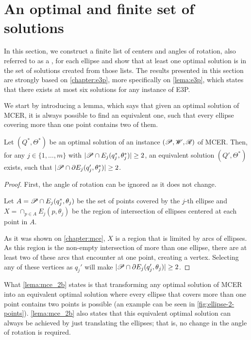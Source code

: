\section{An optimal and finite set of solutions}

In this section, we construct a finite list of centers and angles of rotation, also referred to as a , for each ellipse and show that at least one optimal solution is in the set of solutions created from those lists. The results presented in this section are strongly based on \autoref{chapter:e3p}, more specifically on \autoref{lema:e3p}, which states that there exists at most six solutions for any instance of E3P.

We start by introducing a lemma, which says that given an optimal solution of MCER, it is always possible to find an equivalent one, such that every ellipse covering more than one point contains two of them.

\begin{lema}\label{lema:mce_2b}
	Let $(Q^*, \Theta^*)$ be an optimal solution of an instance $(\mathscr{P}, \mathscr{W}, \mathscr{R})$ of MCER. 
	Then, for any $j\in\{1, \dots, m\}$ with $|\mathscr{P} \cap E_j(q_j^*, \theta_j^*)|\ge2$, 
	an equivalent solution $(Q', \Theta^*)$ exists, such that $|\mathscr{P} \cap \partial E_j(q_j', \theta_j^*)|\ge 2$.
\end{lema}

\begin{proof}
	First, the angle of rotation can be ignored as it does not change.
	
	Let $A=\mathscr{P} \cap E_j(q_j^*, \theta_j)$ be the set of points covered by the $j$-th ellipse and $X=\cap_{p \in A}E_j(p, \theta_j)$ be the region of intersection of ellipses centered at each point in $A$.

	As it was shown on \autoref{chapter:mce}, $X$ is a region that is limited by arcs of ellipses. As this region is the non-empty intersection of more than one ellipse, there are at least two of these arcs that encounter at one point, creating a vertex. Selecting any of these vertices as $q_j'$ will make $|\mathscr{P} \cap \partial E_j(q_j', \theta_j)| \ge 2$.
	
\end{proof}

What \autoref{lema:mce_2b} states is that transforming any optimal solution of MCER into an equivalent optimal solution where every ellipse that covers more than one point contains two points is possible (an example can be seen in \autoref{fig:ellipse-2-points}). \autoref{lema:mce_2b} also states that this equivalent optimal solution can always be achieved by just translating the ellipses; that is, no change in the angle of rotation is required. 

